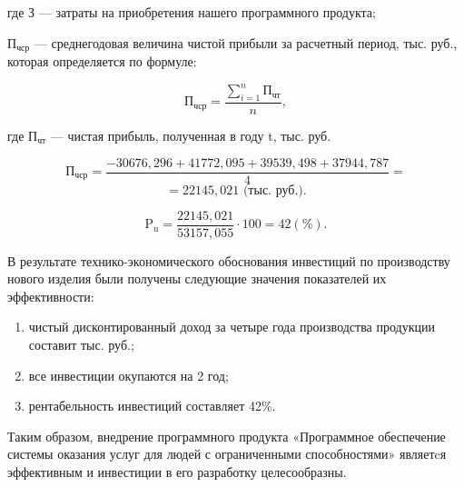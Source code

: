 где \(\text{З}\) --- затраты на приобретения нашего программного продукта;

\(\text{П}_{\text{чср}}\) --- среднегодовая величина чистой прибыли за расчетный период, тыс. руб., которая определяется по формуле:

\begin{displaymath}
  \text{П}_{\text{чср}} = \frac{\sum\limits_{i=1}^n \text{П}_{\text{чт}}}{n},
\end{displaymath}

где \(\text{П}_{\text{чт}}\) --- чистая прибыль, полученная в году t, тыс. руб. 

\begin{displaymath}
  \text{П}_{\text{чср}} = \frac{-30676,296+41772,095+39539,498+37944,787}{4} =
\end{displaymath}
\begin{displaymath}
  = 22145,021 \text{ (тыс. руб.)}.
\end{displaymath}

\begin{displaymath}
  \text{P}_{\text{u}} = \frac{22145,021}{53157,055}\cdot100=42(\%).
\end{displaymath}

В результате технико-экономического обоснования инвестиций по производству нового изделия были получены следующие значения показателей их эффективности:
\begin{enumerate}
    \item чистый дисконтированный доход за четыре года производства продукции составит тыс. руб.;
    \item все инвестиции окупаются на 2 год;  
    \item рентабельность инвестиций составляет 42\%.
\end{enumerate}

Таким образом, внедрение программного продукта «Программное обеспечение системы оказания услуг для людей с ограниченными способностями» являетcя эффективным и инвестиции в его разработку целесообразны.
